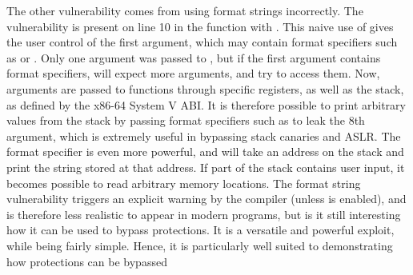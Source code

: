 


The other vulnerability comes from using  format strings incorrectly. The vulnerability is present on line 10 in the  function with . This naive use of  gives the user control of the first argument, which may contain format specifiers such as  or . Only one argument was passed to , but if the first argument contains format specifiers,  will expect more arguments, and try to access them. Now, arguments are passed to functions through specific registers, as well as the stack, as defined by the x86-64 System V ABI\cite{systemv}. It is therefore possible to print arbitrary values from the stack by passing format specifiers such as  to leak the 8th argument, which is extremely useful in bypassing stack canaries and ASLR.
The  format specifier is even more powerful, and will take an address on the stack and print the string stored at that address. If part of the stack contains user input, it becomes possible to read arbitrary memory locations. The format string vulnerability triggers an explicit warning by the compiler (unless  is enabled), and is therefore less realistic to appear in modern programs, but is it still interesting how it can be used to bypass protections. It is a versatile and powerful exploit, while being fairly simple. Hence, it is particularly well suited to demonstrating how protections can be bypassed

